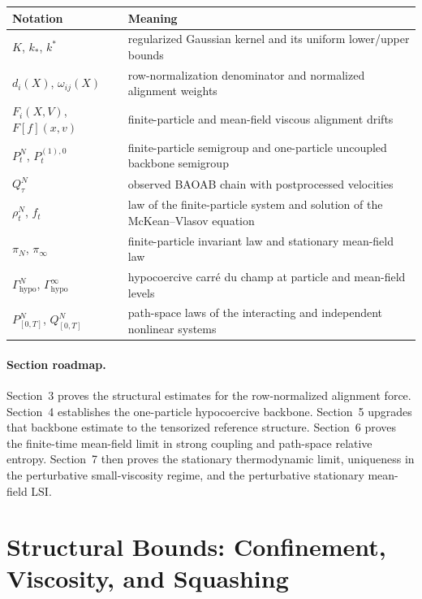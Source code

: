\documentclass[11pt]{article}
\theoremstyle{definition}
\theoremstyle{remark}
\begin{document}
\begin{center}
\footnotesize
\begin{tabular}{|p{}|p{}|}
\hline
\textbf{Notation} & \textbf{Meaning} \\
\hline
\(K\), \(k_*\), \(k^*\) & regularized Gaussian kernel and its uniform lower/upper bounds \\
\hline
\(d_i(X)\), \(\omega_{ij}(X)\) & row-normalization denominator and normalized alignment weights \\
\hline
\(F_i(X,V)\), \(F[f](x,v)\) & finite-particle and mean-field viscous alignment drifts \\
\hline
\(P_t^N\), \(P_t^{(1),0}\) & finite-particle semigroup and one-particle uncoupled backbone semigroup \\
\hline
\(Q_\tau^N\) & observed BAOAB chain with postprocessed velocities \\
\hline
\(\rho_t^N\), \(f_t\) & law of the finite-particle system and solution of the McKean--Vlasov equation \\
\hline
\(\pi_N\), \(\pi_\infty\) & finite-particle invariant law and stationary mean-field law \\
\hline
\(\Gamma_{\mathrm{hypo}}^N\), \(\Gamma_{\mathrm{hypo}}^\infty\) & hypocoercive carré du champ at particle and mean-field levels \\
\hline
\(P_{[0,T]}^N\), \(Q_{[0,T]}^N\) & path-space laws of the interacting and independent nonlinear systems \\
\hline
\end{tabular}
\normalsize
\end{center}

\paragraph{Section roadmap.}
Section~3 proves the structural estimates for the row-normalized alignment
force. Section~4 establishes the one-particle hypocoercive backbone.
Section~5 upgrades that backbone estimate to the tensorized reference
structure. Section~6 proves the finite-time mean-field limit in strong coupling
and path-space relative entropy. Section~7 then proves the stationary
thermodynamic limit, uniqueness in the perturbative small-viscosity regime, and
the perturbative stationary mean-field LSI.

\section{Structural Bounds: Confinement, Viscosity, and Squashing}
\end{document}
